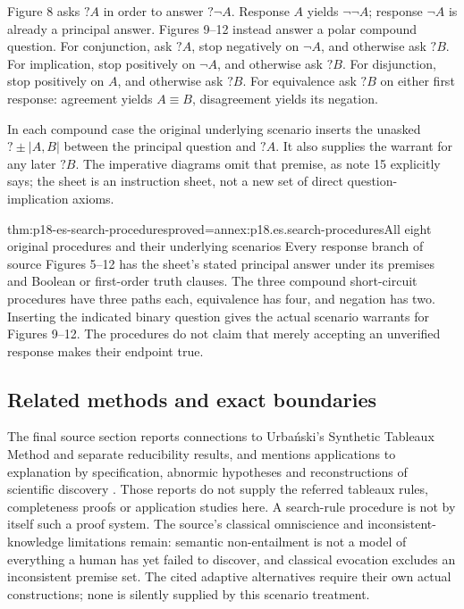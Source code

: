 Figure 8 asks \(?A\) in order to answer \(?\neg A\). Response \(A\)
yields \(\neg\neg A\); response \(\neg A\) is already a principal answer.
Figures 9--12 instead answer a polar compound question. For conjunction,
ask \(?A\), stop negatively on \(\neg A\), and otherwise ask \(?B\).
For implication, stop positively on \(\neg A\), and otherwise ask \(?B\).
For disjunction, stop positively on \(A\), and otherwise ask \(?B\).
For equivalence ask \(?B\) on either first response: agreement yields
\(A\equiv B\), disagreement yields its negation.

In each compound case the original underlying scenario inserts the unasked
\(?\pm|A,B|\) between the principal question and \(?A\). It also
supplies the warrant for any later \(?B\). The imperative diagrams omit
that premise, as note 15 explicitly says; the sheet is an instruction sheet,
not a new set of direct question-implication axioms.



\begin{hbtheorem}{thm:p18-es-search-procedures}{proved=annex:p18.es.search-procedures}{All eight original procedures and their underlying scenarios}
Every response branch of source Figures 5--12 has the sheet's stated principal
answer under its premises and Boolean or first-order truth clauses. The three
compound short-circuit procedures have three paths each, equivalence has four,
and negation has two. Inserting the indicated binary question gives the actual
scenario warrants for Figures 9--12. The procedures do not claim that merely
accepting an unverified response makes their endpoint true.
\end{hbtheorem}

\subsection{Related methods and exact boundaries}

The final source section reports connections to Urba\'nski's Synthetic Tableaux
Method and separate reducibility results, and mentions applications to
explanation by specification, abnormic hypotheses and reconstructions of
scientific discovery \cite[pp.~40--43]{Wisniewski2001QuestionsInferences}.
Those reports do not supply the referred tableaux rules, completeness proofs
or application studies here. A search-rule procedure is not by itself such
a proof system. The source's classical omniscience and inconsistent-knowledge
limitations remain: semantic non-entailment is not a model of everything a
human has yet failed to discover, and classical evocation excludes an
inconsistent premise set. The cited adaptive alternatives require their own
actual constructions; none is silently supplied by this scenario treatment.

